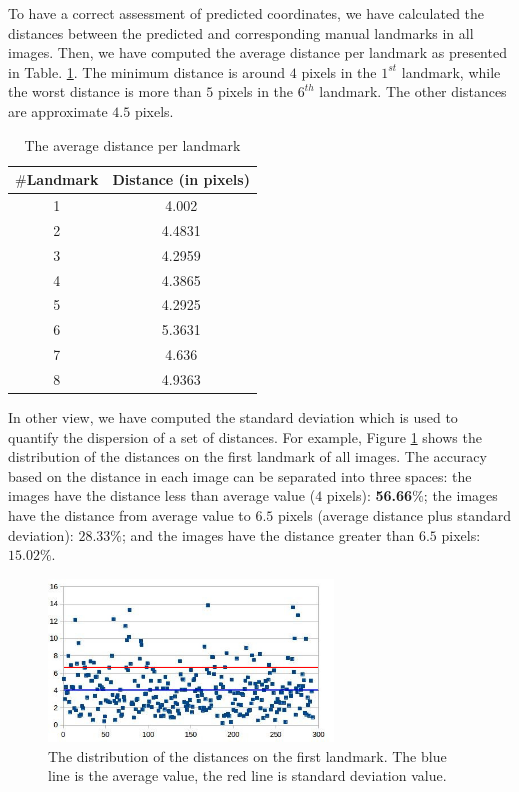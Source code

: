 \documentclass{article} %
\begin{document}
\begin{multicols}{2}
To have a correct assessment of predicted coordinates, we have calculated the distances between the predicted and corresponding manual landmarks in all images. Then, we have computed the average distance per landmark as presented in Table. \ref{table2}. The minimum distance is around $4$ pixels in the $1^{st}$ landmark, while the worst distance is more than $5$ pixels in the $6^{th}$ landmark. The other distances are approximate $4.5$ pixels.
\begin{table}[H]
	\centering
	\begin{tabular}{|c|c|}
		\hline
		\textbf{$\#$Landmark} & \textbf{Distance} (in pixels) \\ \hline
		1 & 4.002  \\ \hline
		2 & 4.4831 \\ \hline
		3 & 4.2959 \\ \hline
		4 & 4.3865 \\ \hline
		5 & 4.2925 \\ \hline
		6 & 5.3631 \\ \hline
		7 & 4.636 \\ \hline
		8 & 4.9363 \\ \hline
	\end{tabular}	
	\caption{\footnotesize{The average distance per landmark}}
	\label{table2}
\end{table}

In other view, we have computed the standard deviation \cite{bland1996statistics} which is used to quantify the dispersion of a set of distances. For example, Figure \ref{figchartlm1} shows the distribution of the distances on the first landmark of all images. The accuracy based on the distance in each image can be separated into three spaces: the images have the distance less than average value ($4$ pixels): \textbf{56.66$\%$}; the images have the distance from average value to $6.5$ pixels (average distance plus standard deviation): \textbf{$28.33\%$}; and the images have the distance greater than $6.5$ pixels: \textbf{$15.02\%$}. 

\begin{figure}[H]
	\centerline{\includegraphics[height=1.7in]{images/lm1_cnn_2.jpg}}
	\caption{\footnotesize{The distribution of the distances on the first landmark. The blue line is the average value, the red line is standard deviation value.}}
	\label{figchartlm1}
\end{figure}


\end{multicols}
\end{document}

